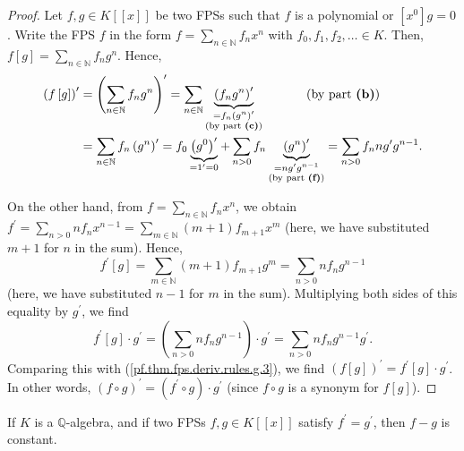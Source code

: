 \begin{proof}
Let $f,g\in K\left[  \left[  x\right]  \right]  $ be two FPSs
such that $f$ is a polynomial or $\left[  x^{0}\right]  g=0$. Write the FPS
$f$ in the form $f=\sum_{n\in\mathbb{N}}f_{n}x^{n}$ with $f_{0},f_{1}%
,f_{2},\ldots\in K$. Then, $f\left[  g\right]  =\sum_{n\in\mathbb{N}}%
f_{n}g^{n}$. Hence,%
\begin{align}
\left(  f\left[  g\right]  \right)  ^{\prime}  &  =\left(  \sum_{n\in
\mathbb{N}}f_{n}g^{n}\right)  ^{\prime}=\sum_{n\in\mathbb{N}}%
\underbrace{\left(  f_{n}g^{n}\right)  ^{\prime}}_{\substack{=f_{n}\left(
g^{n}\right)  ^{\prime}\\\text{(by part \textbf{(c)})}}}
\ \ \ \ \ \ \ \ \ \ \left(  \text{by part \textbf{(b)}}\right) \nonumber\\
&  =\sum_{n\in\mathbb{N}}f_{n}\left(  g^{n}\right)  ^{\prime}=f_{0}%
\underbrace{\left(  g^{0}\right)  ^{\prime}}_{=1^{\prime}=0}+\sum_{n>0}%
f_{n}\underbrace{\left(  g^{n}\right)  ^{\prime}}_{\substack{=ng^{\prime
}g^{n-1}\\\text{(by part \textbf{(f)})}%
}}=\sum_{n>0}f_{n} n g^{\prime} g^{n-1}. \label{pf.thm.fps.deriv.rules.g.3}%
\end{align}

On the other hand, from $f=\sum_{n\in\mathbb{N}}f_{n}x^{n}$, we obtain
$f^{\prime}=\sum_{n>0}nf_{n}x^{n-1}=\sum_{m\in\mathbb{N}}\left(  m+1\right)
f_{m+1}x^{m}$ (here, we have substituted $m+1$ for $n$ in the sum). Hence,
\[
f^{\prime}\left[  g\right]  =\sum_{m\in\mathbb{N}}\left(  m+1\right)
f_{m+1}g^{m}=\sum_{n>0}nf_{n}g^{n-1}%
\]
(here, we have substituted $n-1$ for $m$ in the sum). Multiplying both sides
of this equality by $g^{\prime}$, we find%
\[
f^{\prime}\left[  g\right]  \cdot g^{\prime}=\left(  \sum_{n>0}nf_{n}%
g^{n-1}\right)  \cdot g^{\prime}=\sum_{n>0}nf_{n}g^{n-1}g^{\prime}.
\]
Comparing this with (\ref{pf.thm.fps.deriv.rules.g.3}), we find $\left(
f\left[  g\right]  \right)  ^{\prime}=f^{\prime}\left[  g\right]  \cdot
g^{\prime}$. In other words, $\left(  f\circ g\right)  ^{\prime}=\left(
f^{\prime}\circ g\right)  \cdot g^{\prime}$ (since $f\circ g$ is a synonym for
$f\left[  g\right]  $).
\end{proof}

\begin{lemma}
\label{lem.fps.deriv.rules.h}
\leanhelper
\leanok
If $K$ is a $\mathbb{Q}$-algebra, and if two FPSs $f,g\in
K\left[  \left[  x\right]  \right]  $ satisfy $f^{\prime}=g^{\prime}$, then
$f-g$ is constant.
\end{lemma}

